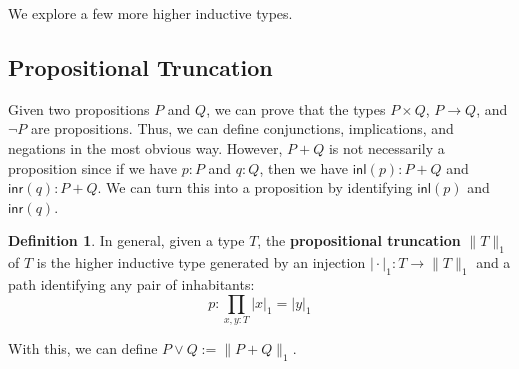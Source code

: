 \documentclass{amsart}
\theoremstyle{definition}
\newtheorem{defn}{Definition}[section]
\newcommand{\type}{\ensuremath{\mathsf{~type}}}
\newcommand{\defeq}{\ensuremath{\overset{\boldsymbol{\cdot}}{=}}}
\newcommand{\Ind}{\ensuremath{\mathsf{ind}}}
\newcommand{\inl}{\ensuremath{\mathsf{inl}}}
\newcommand{\inr}{\ensuremath{\mathsf{inr}}}
\renewcommand{\emph}{\textbf}
\begin{document}

We explore a few more higher inductive types.

\subsection{Propositional Truncation}\label{sec:propositional-truncation}
Given two propositions $P$ and $Q$, we can prove that the types $P \times Q$, $P \to Q$, and $\lnot P$ are propositions.
Thus, we can define conjunctions, implications, and negations in the most obvious way.
However, $P + Q$ is not necessarily a proposition since if we have $p : P$ and $q : Q$, then we have $\inl(p) : P + Q$ and $\inr(q) : P + Q$.
We can turn this into a proposition by identifying $\inl(p)$ and $\inr(q)$.
\begin{defn}
    In general, given a type $T$, the \emph{propositional truncation} $\| T \|_1$ of $T$ is the higher inductive type generated by an injection $\vert\cdot\vert_{1} : T \to \| T \|_{1}$ and a path identifying any pair of inhabitants:
    \[
        p : \prod_{x,y : T}\vert x \vert_{1} = \vert y \vert_{1}
    \]
\end{defn}
With this, we can define $P \lor Q := \| P + Q \|_{1}$.
\end{document}
